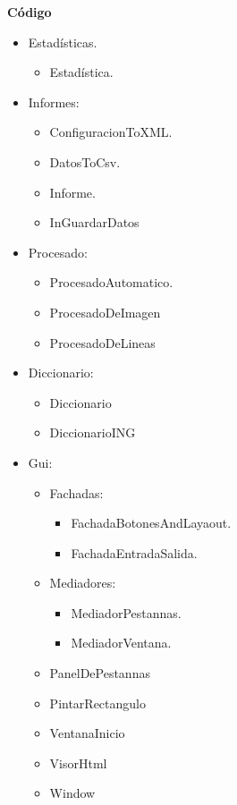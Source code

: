 \textbf{Código}
\begin{itemize}
	\item Estadísticas.
		\begin{itemize}
			\item Estadística.
		\end{itemize}
	\item Informes:
		\begin{itemize}
			\item ConfiguracionToXML.
			\item DatosToCsv.
			\item Informe.
			\item InGuardarDatos
		\end{itemize}
	\item Procesado:
		\begin{itemize}
			\item ProcesadoAutomatico.
			\item ProcesadoDeImagen
			\item ProcesadoDeLineas
		\end{itemize}
	\item Diccionario:
		\begin{itemize}
			\item Diccionario
			\item DiccionarioING
		\end{itemize}	
	\item Gui:
	

 
\begin{itemize}
		\item Fachadas:
			\begin{itemize}
				\item FachadaBotonesAndLayaout.
				\item FachadaEntradaSalida.
			\end{itemize}
		\item Mediadores:
			\begin{itemize}
				\item MediadorPestannas.
				\item MediadorVentana.
			\end{itemize}
		\item PanelDePestannas
		\item PintarRectangulo
		\item VentanaInicio
		\item VisorHtml
		\item Window
\end{itemize}
\end{itemize}	

